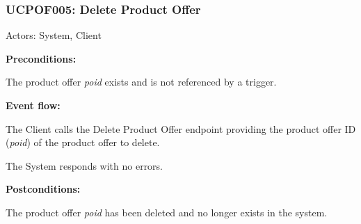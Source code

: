 \begin{ucbox}{\subsubsection{UCPOF005: Delete Product Offer}}
\label{UCPOF005}

Actors: System, Client

\textbf{Preconditions:}

\ucitem The product offer \textit{poid} exists and is not referenced by a trigger.

\textbf{Event flow:}

\ucitem The Client calls the Delete Product Offer endpoint providing the product offer ID (\textit{poid}) of the product offer to delete.

\ucitem The System responds with no errors.

\textbf{Postconditions:}

\ucitem The product offer \textit{poid} has been deleted and no longer exists in the system.

\end{ucbox}
\newpage